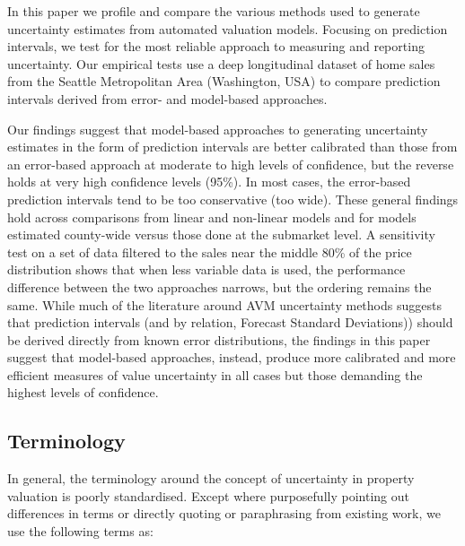 \documentclass[colTwo]{anon}
\theoremstyle{definition}
\begin{document}
In this paper we profile and compare the various methods used to generate uncertainty estimates from automated valuation models. Focusing on prediction intervals, we test for the most reliable approach to measuring and reporting uncertainty.   Our empirical tests use a deep longitudinal dataset of home sales from the Seattle Metropolitan Area (Washington, USA) to compare prediction intervals derived from error- and model-based approaches. 

Our findings suggest that model-based approaches to generating uncertainty estimates in the form of prediction intervals are better calibrated than those from an error-based approach at moderate to high levels of confidence, but the reverse holds at very high confidence levels (95\%). In most cases, the error-based prediction intervals tend to be too conservative (too wide).  These general findings hold across comparisons from linear and non-linear models and for models estimated county-wide versus those done at the submarket level. A sensitivity test on a set of data filtered to the sales near the middle 80\% of the price distribution shows that when less variable data is used, the performance difference between the two approaches narrows, but the ordering remains the same. While much of the literature around AVM uncertainty methods suggests that prediction intervals (and by relation, Forecast Standard Deviations)) should be derived directly from known error distributions, the findings in this paper suggest that model-based approaches, instead, produce more calibrated and more efficient measures of value uncertainty in all cases but those demanding the highest levels of confidence.  

\subsection{Terminology}

In general, the terminology around the concept of uncertainty in property valuation is poorly standardised. Except where purposefully pointing out differences in terms or directly quoting or paraphrasing from existing work, we use the following terms as:
\end{document}
